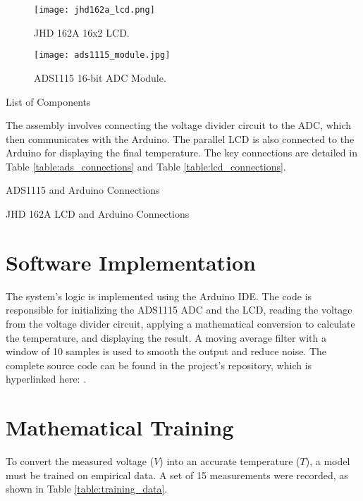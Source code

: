 \documentclass[conference]{IEEEtran}
\begin{document}
\begin{figure}[!h]
    \centering
    \texttt{[image: jhd162a\_lcd.png]} %
    \caption{JHD 162A 16x2 LCD.}
    \label{fig:lcd}
\end{figure}

\begin{figure}[!h]
    \centering
    \texttt{[image: ads1115\_module.jpg]} %
    \caption{ADS1115 16-bit ADC Module.}
    \label{fig:ads1115}
\end{figure}


\begin{table}[!h]
  \centering
  \caption{List of Components}
  \label{table:list}
  
\end{table}

The assembly involves connecting the voltage divider circuit to the ADC, which then communicates with the Arduino. The parallel LCD is also connected to the Arduino for displaying the final temperature. The key connections are detailed in Table \ref{table:ads_connections} and Table \ref{table:lcd_connections}.

\begin{table}[h!]
  \centering
  \caption{ADS1115 and Arduino Connections}
  \label{table:ads_connections}
  
\end{table}

\begin{table}[h!]
  \centering
  \caption{JHD 162A LCD and Arduino Connections}
  \label{table:lcd_connections}
  
\end{table}

\section{Software Implementation}
The system's logic is implemented using the Arduino IDE. The code is responsible for initializing the ADS1115 ADC and the LCD, reading the voltage from the voltage divider circuit, applying a mathematical conversion to calculate the temperature, and displaying the result. A moving average filter with a window of 10 samples is used to smooth the output and reduce noise. The complete source code can be found in the project's repository, which is hyperlinked here: .


\section{Mathematical Training}
To convert the measured voltage ($V$) into an accurate temperature ($T$), a model must be trained on empirical data. A set of 15 measurements were recorded, as shown in Table \ref{table:training_data}.
\end{document}
